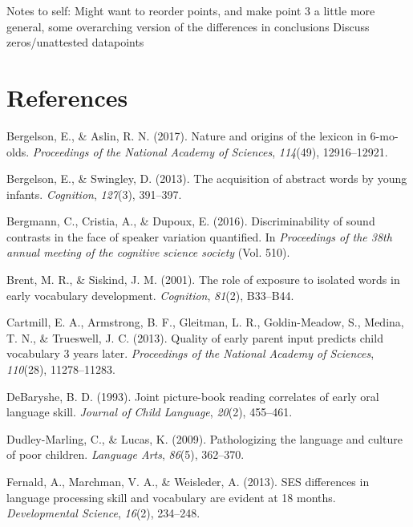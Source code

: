 \documentclass[floatsintext,man]{apa6}
\theoremstyle{definition}
\theoremstyle{definition}
\theoremstyle{definition}
\theoremstyle{remark}
\begin{document}
Notes to self: Might want to reorder points, and make point 3 a little
more general, some overarching version of the differences in conclusions
Discuss zeros/unattested datapoints

\newpage

\section{References}\label{references}

\setlength{\parindent}{-0.5in} \setlength{\leftskip}{0.5in}

\hypertarget{refs}{}
\hypertarget{ref-bergelson2017nature}{}
Bergelson, E., \& Aslin, R. N. (2017). Nature and origins of the lexicon
in 6-mo-olds. \emph{Proceedings of the National Academy of Sciences},
\emph{114}(49), 12916--12921.

\hypertarget{ref-bergelson2013acquisition}{}
Bergelson, E., \& Swingley, D. (2013). The acquisition of abstract words
by young infants. \emph{Cognition}, \emph{127}(3), 391--397.

\hypertarget{ref-bergmann2016discriminability}{}
Bergmann, C., Cristia, A., \& Dupoux, E. (2016). Discriminability of
sound contrasts in the face of speaker variation quantified. In
\emph{Proceedings of the 38th annual meeting of the cognitive science
society} (Vol. 510).

\hypertarget{ref-brent2001role}{}
Brent, M. R., \& Siskind, J. M. (2001). The role of exposure to isolated
words in early vocabulary development. \emph{Cognition}, \emph{81}(2),
B33--B44.

\hypertarget{ref-cartmill2013quality}{}
Cartmill, E. A., Armstrong, B. F., Gleitman, L. R., Goldin-Meadow, S.,
Medina, T. N., \& Trueswell, J. C. (2013). Quality of early parent input
predicts child vocabulary 3 years later. \emph{Proceedings of the
National Academy of Sciences}, \emph{110}(28), 11278--11283.

\hypertarget{ref-debaryshe1993joint}{}
DeBaryshe, B. D. (1993). Joint picture-book reading correlates of early
oral language skill. \emph{Journal of Child Language}, \emph{20}(2),
455--461.

\hypertarget{ref-dudley2009pathologizing}{}
Dudley-Marling, C., \& Lucas, K. (2009). Pathologizing the language and
culture of poor children. \emph{Language Arts}, \emph{86}(5), 362--370.

\hypertarget{ref-fernald2013ses}{}
Fernald, A., Marchman, V. A., \& Weisleder, A. (2013). SES differences
in language processing skill and vocabulary are evident at 18 months.
\emph{Developmental Science}, \emph{16}(2), 234--248.
\end{document}
